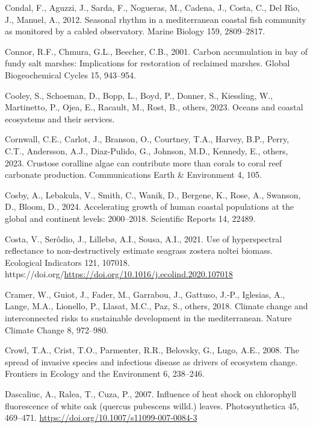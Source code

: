 \documentclass[
  letterpaper,
  11pt,
  english,
  singlespacing,
  headsepline]{MastersDoctoralThesis}
\newlength{\cslhangindent}
\newenvironment{CSLReferences}[2] %
 {\begin{list}{}{%
  \setlength{\itemindent}{0pt}
  \setlength{\leftmargin}{0pt}
  \setlength{\parsep}{0pt}
  \ifodd #1
   \setlength{\leftmargin}{\cslhangindent}
   \setlength{\itemindent}{-1\cslhangindent}
  \fi
  \setlength{\itemsep}{#2\baselineskip}}}
 {\end{list}}
\begin{document}
\begin{CSLReferences}{1}{0}
Condal, F., Aguzzi, J., Sarda, F., Nogueras, M., Cadena, J., Costa, C.,
Del Rı́o, J., Manuel, A., 2012. Seasonal rhythm in a mediterranean
coastal fish community as monitored by a cabled observatory. Marine
Biology 159, 2809--2817.

Connor, R.F., Chmura, G.L., Beecher, C.B., 2001. Carbon accumulation in
bay of fundy salt marshes: Implications for restoration of reclaimed
marshes. Global Biogeochemical Cycles 15, 943--954.

Cooley, S., Schoeman, D., Bopp, L., Boyd, P., Donner, S., Kiessling, W.,
Martinetto, P., Ojea, E., Racault, M., Rost, B., others, 2023. Oceans
and coastal ecosystems and their services.

Cornwall, C.E., Carlot, J., Branson, O., Courtney, T.A., Harvey, B.P.,
Perry, C.T., Andersson, A.J., Diaz-Pulido, G., Johnson, M.D., Kennedy,
E., others, 2023. Crustose coralline algae can contribute more than
corals to coral reef carbonate production. Communications Earth \&
Environment 4, 105.

Cosby, A., Lebakula, V., Smith, C., Wanik, D., Bergene, K., Rose, A.,
Swanson, D., Bloom, D., 2024. Accelerating growth of human coastal
populations at the global and continent levels: 2000--2018. Scientific
Reports 14, 22489.

Costa, V., Serôdio, J., Lillebø, A.I., Sousa, A.I., 2021. Use of
hyperspectral reflectance to non-destructively estimate seagrass zostera
noltei biomass. Ecological Indicators 121, 107018.
https://doi.org/\url{https://doi.org/10.1016/j.ecolind.2020.107018}

Cramer, W., Guiot, J., Fader, M., Garrabou, J., Gattuso, J.-P.,
Iglesias, A., Lange, M.A., Lionello, P., Llasat, M.C., Paz, S., others,
2018. Climate change and interconnected risks to sustainable development
in the mediterranean. Nature Climate Change 8, 972--980.

Crowl, T.A., Crist, T.O., Parmenter, R.R., Belovsky, G., Lugo, A.E.,
2008. The spread of invasive species and infectious disease as drivers
of ecosystem change. Frontiers in Ecology and the Environment 6,
238--246.

Dascaliuc, A., Ralea, T., Cuza, P., 2007. Influence of heat shock on
chlorophyll fluorescence of white oak (quercus pubescens willd.) leaves.
Photosynthetica 45, 469--471.
\url{https://doi.org/10.1007/s11099-007-0084-3}


\end{CSLReferences}
\end{document}
